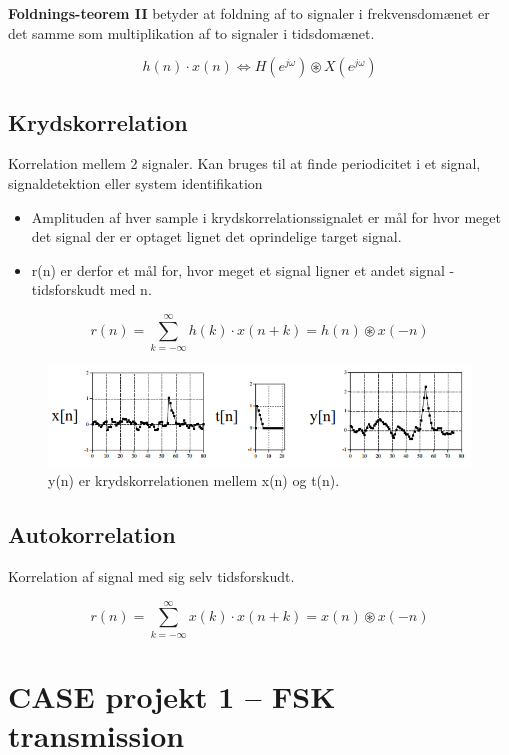 \documentclass[danish]{article}
\begin{document}
\textbf{Foldnings-teorem II} betyder at foldning af to signaler i frekvensdomænet er det samme som multiplikation af to signaler i tidsdomænet. 

\begin{equation}
h(n) \cdot x(n) \Leftrightarrow H(e^{j\omega}) \circledast X(e^{j\omega})
\end{equation}

\subsection{Krydskorrelation}
Korrelation mellem 2 signaler.
Kan bruges til at finde periodicitet i et signal, signaldetektion eller system identifikation

\begin{itemize}
	\item Amplituden af hver sample i krydskorrelationssignalet er mål for hvor meget det signal der er optaget lignet det oprindelige target signal.
	\item r(n) er derfor et mål for, hvor meget et signal ligner et andet signal - tidsforskudt med n.
\end{itemize}
\begin{equation}
r(n) = \sum_{k=-\infty}^{\infty} h(k) \cdot x(n+k) = h(n) \circledast x(-n)
\end{equation}

\begin{figure}[H]
	\centering
	\includegraphics[width=0.8\linewidth]{graphics/crosscorrelation}
	\caption{y(n) er krydskorrelationen mellem x(n) og t(n).}
	\label{fig:crosscorrelation}
\end{figure}

\subsection{Autokorrelation}
Korrelation af signal med sig selv tidsforskudt.

\begin{equation}
r(n) = \sum_{k=-\infty}^{\infty} x(k) \cdot x(n+k) = x(n) \circledast x(-n)
\end{equation}

\newpage
\section{CASE projekt 1 – FSK transmission}
\newpage
\end{document}

